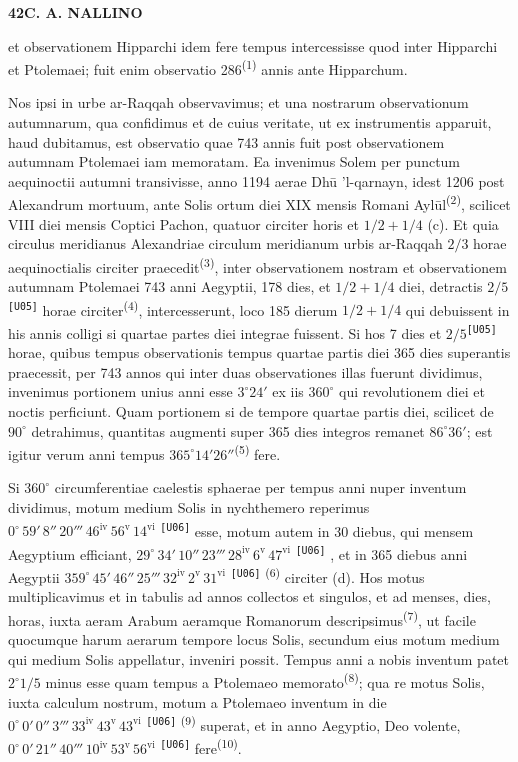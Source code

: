 \documentclass[10pt,a4paper]{article}
\newcommand{\SP}[3]{%
  \clearpage
  \hypertarget{AB01-PDF#1}{}%
  \begin{center}
    \textbf{#2\quad #3}
  \end{center}%
}
\newcommand{\A}[1]{\hypertarget{#1}{}}
\newcommand{\NM}[1]{\textsuperscript{(#1)}}
\newcommand{\U}[2]{%
  #2\textsuperscript{\texttt{[#1]}}%
}
\newcommand{\SX}[7]{%
  \ensuremath{%
    #1^\circ\,#2'\,#3''\,#4'''\,%
    #5^{\mathrm{iv}}\,#6^{\mathrm{v}}\,#7^{\mathrm{vi}}%
  }%
}
\begin{document}

\SP{0131}{42}{C. A. NALLINO}

\A{AB01-PDF0131-P01}
et observationem Hipparchi idem fere tempus intercessisse quod
inter Hipparchi et Ptolemaei; fuit enim observatio 286\NM{1} annis
ante Hipparchum.

\A{AB01-PDF0131-P02}
Nos ipsi in urbe ar-Raqqah observavimus; et una nostrarum
observationum autumnarum, qua confidimus et de cuius veritate,
ut ex instrumentis apparuit, haud dubitamus, est observatio quae
743 annis fuit post observationem autumnam Ptolemaei iam
memoratam. Ea invenimus Solem per punctum aequinoctii autumni
transivisse, anno 1194 aerae Dhū 'l-qarnayn, idest 1206 post
Alexandrum mortuum, ante Solis ortum diei XIX mensis Romani
Aylūl\NM{2}, scilicet VIII diei mensis Coptici Pachon, quatuor
circiter horis et $1/2+1/4$ (c). Et quia circulus meridianus
Alexandriae circulum meridianum urbis ar-Raqqah $2/3$ horae
aequinoctialis circiter praecedit\NM{3}, inter observationem nostram
et observationem autumnam Ptolemaei 743 anni Aegyptii, 178 dies,
et $1/2+1/4$ diei, detractis \U{U05}{$2/5$} horae circiter\NM{4},
intercesserunt, loco 185 dierum $1/2+1/4$ qui debuissent in his
annis colligi si quartae partes diei integrae fuissent. Si hos
7 dies et \U{U05}{$2/5$} horae, quibus tempus observationis tempus
quartae partis diei 365 dies superantis praecessit, per 743 annos
qui inter duas observationes illas fuerunt dividimus, invenimus
portionem unius anni esse $3^\circ24'$ ex iis $360^\circ$ qui
revolutionem diei et noctis perficiunt. Quam portionem si de
tempore quartae partis diei, scilicet de $90^\circ$ detrahimus,
quantitas augmenti super 365 dies integros remanet $86^\circ36'$;
est igitur verum anni tempus $365^\circ14'26''$\NM{5} fere.

\A{AB01-PDF0131-P03}
Si $360^\circ$ circumferentiae caelestis sphaerae per tempus anni
nuper inventum dividimus, motum medium Solis in nychthemero
reperimus \U{U06}{\SX{0}{59}{8}{20}{46}{56}{14}} esse, motum autem
in 30 diebus, qui mensem Aegyptium efficiant,
\U{U06}{\SX{29}{34}{10}{23}{28}{6}{47}}, et in 365 diebus anni
Aegyptii \U{U06}{\SX{359}{45}{46}{25}{32}{2}{31}}\NM{6} circiter
(d). Hos motus multiplicavimus et in tabulis ad annos collectos
et singulos, et ad menses, dies, horas, iuxta aeram Arabum
aeramque Romanorum descripsimus\NM{7}, ut facile quocumque harum
aerarum tempore locus Solis, secundum eius motum medium qui
medium Solis appellatur, inveniri possit. Tempus anni a nobis
inventum patet $2^\circ1/5$ minus esse quam tempus a Ptolemaeo
memorato\NM{8}; qua re motus Solis, iuxta calculum nostrum,
motum a Ptolemaeo inventum in die
\U{U06}{\SX{0}{0}{0}{3}{33}{43}{43}}\NM{9} superat, et in anno
Aegyptio, Deo volente,
\U{U06}{\SX{0}{0}{21}{40}{10}{53}{56}} fere\NM{10}.
\end{document}
